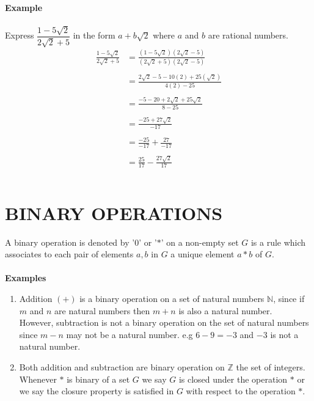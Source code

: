 \documentclass[11pt,a4paper]{article}
\begin{document}
\textbf{Example}\\\\
Express $\dfrac{1-5\sqrt{2}}{2\sqrt{2}+5}$ in the form $a+b\sqrt{2}$ where $a$ and $b$ are rational numbers.\\
\begin{align*}
\frac{1-5\sqrt{2}}{2\sqrt{2}+5} & =\frac{(1-5\sqrt{2})(2\sqrt{2}-5)}{(2\sqrt{2}+5)(2\sqrt{2}-5)}\\\\
&=\frac{2\sqrt{2}-5-10(2)+25(\sqrt{2})}{4(2)-25}\\\\
&=\frac{-5-20+2\sqrt{2}+25\sqrt{2}}{8-25}\\\\
&=\frac{-25+27\sqrt{2}}{-17}\\\\
& =\frac{-25}{-17}+\frac{27}{-17}\\\\
& =\frac{25}{17}-\frac{27\sqrt{2}}{17}\\\\
\end{align*}















\pagebreak
\section{BINARY OPERATIONS}
A binary operation is denoted by '$0$' or '$*$' on a non-empty set $G$ is a rule which associates to each pair of elements $a, b$ in $G$ a unique element $a*b$ of $G$.\\\\

\textbf{Examples}
\begin{enumerate}
\item Addition $(+)$ is a binary operation on a set of natural numbers $\mathbb{N}$, since if $m$ and $n$  are natural numbers then $m+n$ is also a natural number.\\
However, subtraction is not a binary operation on the set of natural numbers since $m-n$ may not be a natural number. e.g $6-9=-3$ and $-3$ is not a natural number.
\item Both addition and subtraction are binary operation on $\mathbb{Z}$ the  set of integers.\\ Whenever $*$ is binary of a set $G$ we say $G$ is closed under the operation $*$ or we say the closure property is satisfied in $G$ with respect to the operation $*$.\\
\end{enumerate}
\end{document}
